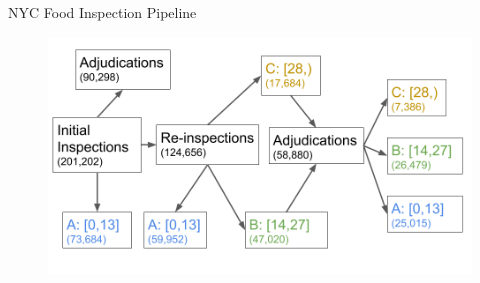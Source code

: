 \documentclass{beamer}
\begin{document}
\begin{frame}{NYC Food Inspection Pipeline}
\begin{figure}
    \centering
    \includegraphics[scale = 0.3]{../../Figures/Scores.png}
\end{figure}
\end{frame}
\end{document}
